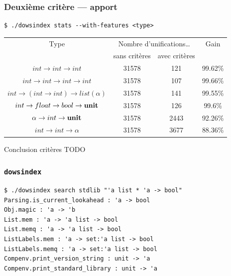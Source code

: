\documentclass[serif]{beamer}
\newcommand{\dowsindex}{\texttt{dowsindex}\xspace}
\begin{document}
\begin{frame}[fragile=singleslide]\frametitle{Deuxième critère — apport}
\small
\begin{verbatim}
$ ./dowsindex stats --with-features <type>
\end{verbatim}
\begin{table}[h]
	\centering
	\begin{tabular}{|*{4}{c|}}
		\hline
			Type &
			\multicolumn{2}{c|}{Nombre d'unifications\dots} &
			Gain
		\\
		\cline{2-3}
			&
			sans critères & avec critères &
		\\
		\hline
			$int \rightarrow int \rightarrow int$ &
			31578 & 121 & 99.62\%
		\\
			$int \rightarrow int \rightarrow int \rightarrow int$ &
			31578 & 107 & 99.66\%
		\\
			$int \rightarrow (int \rightarrow int) \rightarrow list (\alpha)$ &
			31578 & 141 & 99.55\%
		\\
			$int \rightarrow float \rightarrow bool \rightarrow \bold{unit}$ &
			31578 & 126 & 99.6\%
		\\
			$\alpha \rightarrow int \rightarrow \bold{unit}$ &
			31578 & 2443 & 92.26\%
		\\
			$int \rightarrow int \rightarrow \alpha$ &
			31578 & 3677 & 88.36\%
		\\
		\hline
	\end{tabular}
\end{table}
\end{frame}


\begin{frame}{Conclusion critères}
TODO
\end{frame}


\begin{frame}[fragile=singleslide]\frametitle{\dowsindex}
\small
\begin{verbatim}
$ ./dowsindex search stdlib "'a list * 'a -> bool"
Parsing.is_current_lookahead : 'a -> bool
Obj.magic : 'a -> 'b
List.mem : 'a -> 'a list -> bool
List.memq : 'a -> 'a list -> bool
ListLabels.mem : 'a -> set:'a list -> bool
ListLabels.memq : 'a -> set:'a list -> bool
Compenv.print_version_string : unit -> 'a
Compenv.print_standard_library : unit -> 'a
\end{verbatim}
\end{frame}
\end{document}
